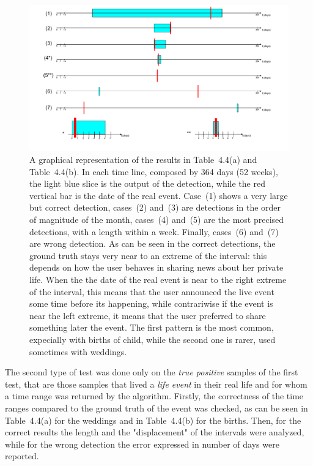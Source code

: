 \begin{figure}
\centering
\includegraphics[width=%
1\textwidth]{img/Timeranges}
\caption{A graphical representation of the results in Table~4.4(a) and Table~4.4(b). In each time line, composed by 364 days (52 weeks), the light blue slice is the output of the detection, while the red vertical bar is the date of the real event. Case~(1) shows a very large but correct detection, cases~(2) and~(3) are detections in the order of magnitude of the month, cases~(4) and~(5) are the most precised detections, with a length within a week. Finally, cases~(6) and~(7) are wrong detection. As can be seen in the correct detections, the ground truth stays very near to an extreme of the interval: this depends on how the user behaves in sharing news about her private life. When the the date of the real event is near to the right extreme of the interval, this means that the user announced the live event some time before its happening, while contrariwise if the event is near the left extreme, it means that the user preferred to share something later the event. The first pattern is the most common, expecially with births of child, while the second one is rarer, used sometimes with weddings.}
\label{fig:timeranges}
\end{figure}

The second type of test was done only on the \emph{true positive} samples of the first test, that are those samples that lived a \emph{life event} in their real life and for whom a time range was returned by the algorithm. Firstly, the correctness of the time ranges compared to the ground truth of the event was checked, as can be seen in Table~4.4(a) for the weddings and in Table~4.4(b) for the births. Then, for the correct results the length and the "displacement" of the intervals were analyzed, while for the wrong detection the error expressed in number of days were reported.

